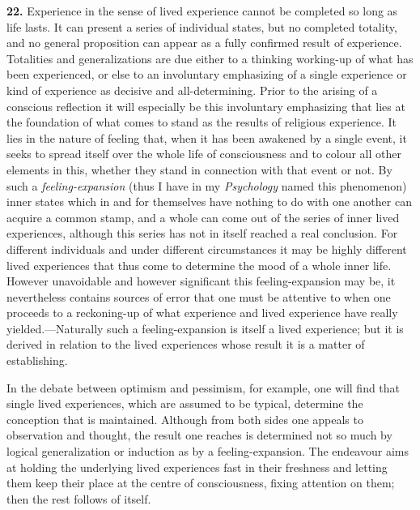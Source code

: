 \documentclass[12pt,a4paper]{book}
\newcommand{\opage}[1]{\marginnote{\footnotesize\textit{[#1]}}}
\begin{document}
\noindent\textbf{22.} Experience in the sense of lived experience cannot be
completed so long as life lasts. It can present a series of individual states,
but no completed totality, and no general proposition can appear as a fully
confirmed result of experience. Totalities and generalizations are due either
to a thinking working-up of what has been experienced, or else to an
involuntary emphasizing of a single experience or kind of experience as
decisive and all-determining. Prior to the arising of a conscious reflection it
will especially be this involuntary emphasizing that lies at the foundation of
what comes to stand as the results of religious experience. It lies in the
nature of feeling that, when it has been awakened by a single event, it seeks
to spread itself over the whole life of consciousness and to colour all other
elements in this, whether they stand in connection with that event or not. By
such a \emph{feeling-expansion} (thus I have in my \emph{Psychology} named
this phenomenon) inner states which in and for themselves have nothing to do
with one another can acquire a common stamp, and a whole can come out of the
series of inner lived experiences, although this series has not in itself
reached a real conclusion. For different individuals and under different
circumstances it may be highly different lived experiences that thus come to
determine the mood 
\opage{56}of a whole inner life. However unavoidable and however
significant this feeling-expansion may be, it nevertheless contains sources of
error that one must be attentive to when one proceeds to a reckoning-up of what
experience and lived experience have really yielded.---Naturally such a
feeling-expansion is itself a lived experience; but it is derived in relation
to the lived experiences whose result it is a matter of establishing.

In the debate between optimism and pessimism, for example, one will find that
single lived experiences, which are assumed to be typical, determine the
conception that is maintained. Although from both sides one appeals to
observation and thought, the result one reaches is determined not so much by
logical generalization or induction as by a feeling-expansion. The endeavour
aims at holding the underlying lived experiences fast in their freshness and
letting them keep their place at the centre of consciousness, fixing attention
on them; then the rest follows of itself.
\end{document}
